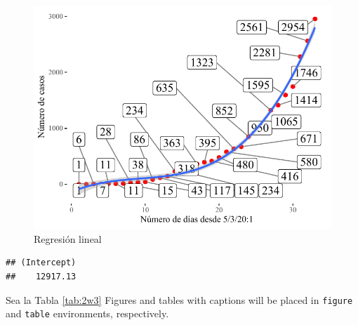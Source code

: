 \documentclass[10pt,]{krantz}
\theoremstyle{definition}
\theoremstyle{definition}
\theoremstyle{definition}
\theoremstyle{definition}
\theoremstyle{remark}
\begin{document}
\begin{figure}

{\centering \includegraphics{E_1_files/figure-latex/ww1w-1} 

}

\caption{Regresión lineal}\label{fig:ww1w}
\end{figure}

\begin{verbatim}
## (Intercept) 
##    12917.13
\end{verbatim}

Sea la Tabla \ref{tab:2w3} Figures and tables with captions will be placed in \texttt{figure} and \texttt{table} environments, respectively.
\end{document}
